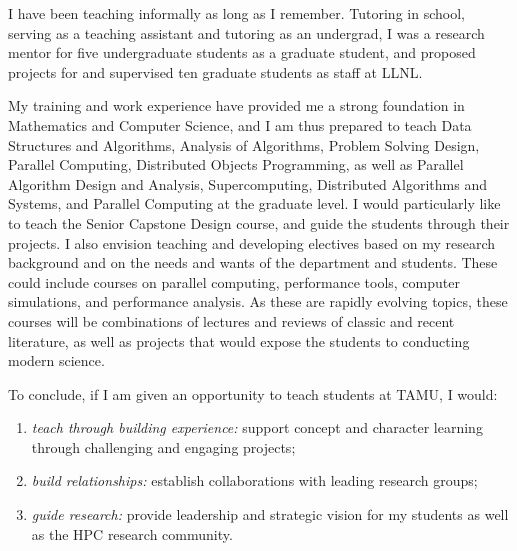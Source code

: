 \documentclass[10pt,letterpaper]{moderncv/moderncv}
\begin{document}
I have been teaching informally as long as I remember.  Tutoring in school, serving as a teaching assistant and tutoring as an undergrad,
I was a research mentor for five undergraduate students as a graduate student, and proposed projects for and supervised ten graduate students as staff at LLNL.

My training and work experience have provided me a strong foundation in Mathematics and Computer Science,
and I am thus prepared to teach
Data Structures and Algorithms,
Analysis of Algorithms,
Problem Solving Design,
Parallel Computing,
Distributed Objects Programming,
as well as
Parallel Algorithm Design and Analysis,
Supercomputing,
Distributed Algorithms and Systems,
and Parallel Computing
at the graduate level.
I would particularly like to teach the Senior Capstone Design course,
and guide the students through their projects.
I also envision teaching and developing electives based on my research background
and on the needs and wants of the department and students.
These could include courses on parallel computing, performance tools,
computer simulations, and performance analysis.
As these are rapidly evolving topics, these courses will be combinations
of lectures and reviews of classic and recent literature,
as well as projects that would expose the students to conducting modern science.

To conclude, if I am given an opportunity to teach students at TAMU, I would:

\begin{enumerate}
\item \emph{teach through building experience:} support concept and character learning through challenging and engaging projects;
\item \emph{build relationships:} establish collaborations with leading research groups;
\item \emph{guide research:} provide leadership and strategic vision for my students as well as the HPC research community.
\end{enumerate}
\end{document}
